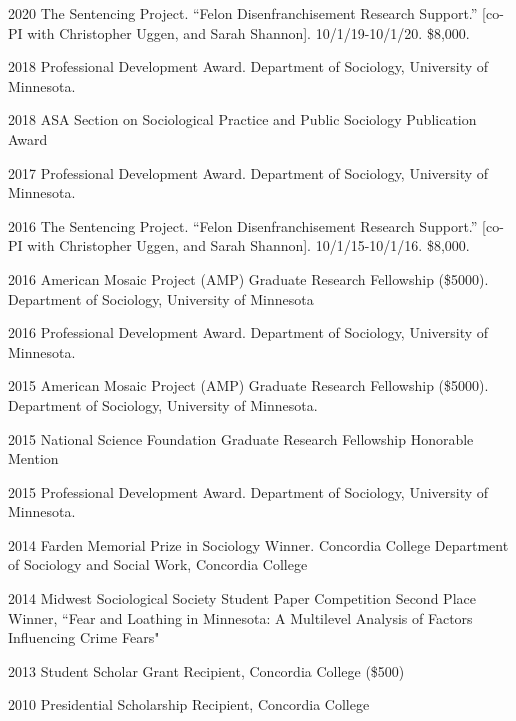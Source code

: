 \documentclass[letterpaper]{article}
\renewenvironment{itemize}{
  \begin{list}{}{
    \setlength{\leftmargin}{1.5em}
  }
}{
  \end{list}
}
\begin{document}
\begin{itemize}
\item 2020 The Sentencing Project. “Felon Disenfranchisement Research Support.” [co-PI with Christopher Uggen, and Sarah Shannon]. 10/1/19-10/1/20. \$8,000.

\item 2018 Professional Development Award. Department of Sociology, University of Minnesota. 
\item 2018 ASA Section on Sociological Practice and Public Sociology Publication Award
\item 2017 Professional Development Award. Department of Sociology, University of Minnesota. 
\item 2016 The Sentencing Project. “Felon Disenfranchisement Research Support.” [co-PI with Christopher Uggen, and Sarah Shannon]. 10/1/15-10/1/16. \$8,000.
\item 2016 American Mosaic Project (AMP) Graduate Research Fellowship (\$5000). Department of Sociology, University of Minnesota
\item 2016 Professional Development Award. Department of Sociology, University of Minnesota. 
\item 2015 American Mosaic Project (AMP) Graduate Research Fellowship (\$5000). Department of Sociology, University of Minnesota. 
\item 2015 National Science Foundation Graduate Research Fellowship Honorable Mention
\item 2015 Professional Development Award. Department of Sociology, University of Minnesota. 
\item 2014 Farden Memorial Prize in Sociology Winner. Concordia College Department of Sociology and Social Work, Concordia College
\item 2014 Midwest Sociological Society Student Paper Competition Second Place Winner,  ``Fear and Loathing in Minnesota: A Multilevel Analysis of Factors Influencing Crime Fears"
\item 2013 Student Scholar Grant Recipient, Concordia College (\$500)
\item 2010 Presidential Scholarship Recipient, Concordia College

\end{itemize}
\end{document}
